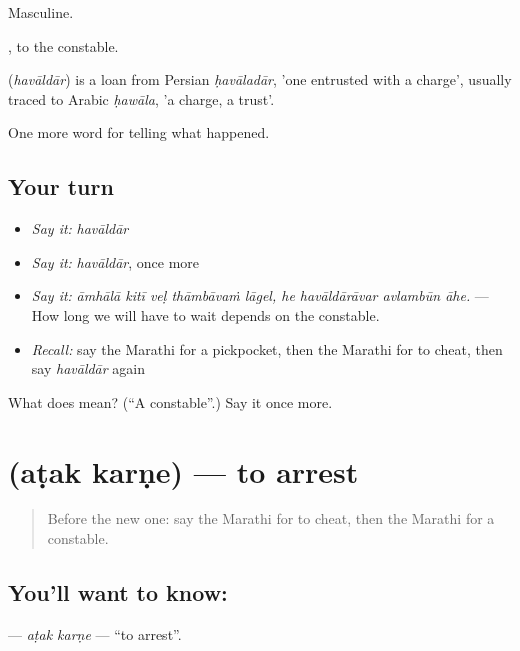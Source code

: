 Masculine.

, to the constable.

\begin{cousinweb}
\textbf{} (\emph{havāldār}) is a loan from Persian \emph{ḥavāladār}, 'one entrusted with a charge', usually traced to Arabic \emph{ḥawāla}, 'a charge, a trust'.
\end{cousinweb}

\begin{grammarlens}[title={What you've built}]
One more word for telling what happened.
\end{grammarlens}

\subsection*{Your turn}
\begin{itemize}
\raggedright
  \item \emph{Say it:} \emph{havāldār}
  \item \emph{Say it:} \emph{havāldār}, once more
  \item \emph{Say it:} \emph{āmhālā kitī veḷ thāmbāvaṁ lāgel, he havāldārāvar avlambūn āhe.} — How long we will have to wait depends on the constable.
  \item \emph{Recall:} say the Marathi for a pickpocket, then the Marathi for to cheat, then say \emph{havāldār} again
\end{itemize}

\begin{tcolorbox}[breakable,colback=teal!4,colframe=teal!35!black,title={Before you move on}]
What does  mean? (\textquotedblleft{}A constable\textquotedblright{}.) Say it once more.
\end{tcolorbox}
\section[\texorpdfstring{\mr{अटक} \mr{करणे} (aṭak karṇe)}{अटक करणे (aṭak karṇe)}]{  (aṭak karṇe) — to arrest}

\label{lesson:MR-C290-atak-karne}



\begin{quote}
Before the new one: say the Marathi for to cheat, then the Marathi for a constable.
\end{quote}

\subsection*{You'll want to know:  }
\textbf{ } — \emph{aṭak karṇe} — \textquotedblleft{}to arrest\textquotedblright{}.

